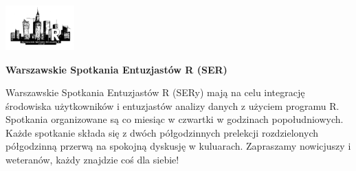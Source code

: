 \documentclass[\main/boa.tex]{subfiles}
\begin{document}
	
	\begin{minipage}[t]{0.915\textwidth}
		\center     
		\includegraphics[width=100px]{img/logos.bw/ser.png} 
	\end{minipage}
	
	\Large \textbf {Warszawskie Spotkania Entuzjastów R (SER)}
	
	
	\vskip 0.3cm
	\normalsize 
	Warszawskie Spotkania Entuzjastów R (SERy) mają na celu integrację środowiska użytkowników i entuzjastów analizy danych z użyciem programu R. Spotkania organizowane są co miesiąc w czwartki w godzinach popołudniowych. Każde spotkanie składa się z dwóch półgodzinnych prelekcji rozdzielonych półgodzinną przerwą na spokojną dyskusję w kuluarach. Zapraszamy nowicjuszy i weteranów, każdy znajdzie coś dla siebie!
	
	\vskip 1.5cm
\end{document}

